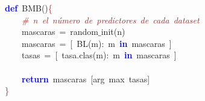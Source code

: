\noindent
\mbox{}\textbf{\textcolor{Blue}{def}}\ BMB\textcolor{BrickRed}{()}\textcolor{Red}{\{} \\
\mbox{}\ \ \ \ \textit{\textcolor{Brown}{\#\ n\ el\ número\ de\ predictores\ de\ cada\ dataset}} \\
\mbox{}\ \ \ \ mascaras\ \textcolor{BrickRed}{=}\ random$\_$init\textcolor{BrickRed}{(}n\textcolor{BrickRed}{)} \\
\mbox{}\ \ \ \ mascaras\ \textcolor{BrickRed}{=}\ \textcolor{BrickRed}{[}\ BL\textcolor{BrickRed}{(}m\textcolor{BrickRed}{):}\ m\ \textbf{\textcolor{Blue}{in}}\ mascaras\ \textcolor{BrickRed}{]} \\
\mbox{}\ \ \ \ tasas\ \textcolor{BrickRed}{=}\ \textcolor{BrickRed}{[}\ tasa\textcolor{BrickRed}{.}clas\textcolor{BrickRed}{(}m\textcolor{BrickRed}{):}\ m\ \textbf{\textcolor{Blue}{in}}\ mascaras\ \textcolor{BrickRed}{]} \\
\mbox{} \\
\mbox{}\ \ \ \ \textbf{\textcolor{Blue}{return}}\ mascaras\ \textcolor{BrickRed}{[}arg\ max\ tasas\textcolor{BrickRed}{]} \\
\mbox{}\textcolor{Red}{\}} \\
\mbox{}
